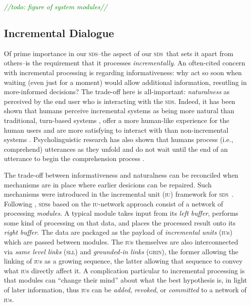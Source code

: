 \documentclass[11pt]{article}
\newcommand{\todo}[1]{\textcolor{green}{\emph{//todo: #1//}}}
\newcommand{\sds}[0]{\textsc{sds}}
\newcommand{\iu}[0]{\textsc{iu}}
\begin{document}
\todo{figure of system modules}

\subsection{Incremental Dialogue}

Of prime importance in our \sds--the aspect of our \sds\ that sets it apart from others--is the requirement that it processes \emph{incrementally}. An often-cited concern with incremental processing is regarding informativeness: why act so soon when waiting (even just for a moment) would allow additional information, resutling in more-informed decisions? The trade-off here is all-important: \emph{naturalness} as perceived by the end user who is interacting with the \sds. Indeed, it has been shown that humans perceive incremental systems as being more natural than traditional, turn-based systems \cite{Aist2006,Skantze2009,skantze2010sigdial,Asri2014}, offer a more human-like experience for the human users \cite{Edlund2008b} and are more satisfying to interact with than non-incremental systems \cite{Aistetal:incrunder-short}. Psycholinguistic research has also shown that humans process (i.e., comprehend) utterances as they unfold and do not wait until the end of an utterance to begin the comprehension process \cite{Tanenhaus1995,Spivey_2002tw}. 

The trade-off between informativeness and naturalness can be reconciled when mechanisms are in place where earlier desicions can be repaired. Such mechanisms were introduced in the incremental unit (\iu) framework for \sds\ \cite{Schlangen2009,Schlangen2011}. Following \cite{kennington-kousidis-schlangen:2014:W14-43}, \sds s based on the \iu-network approach consist of a network of processing \emph{modules}. A typical module takes input from its \emph{left buffer}, performs some kind of processing on that data, and places the processed result onto its \emph{right buffer}. The data are packaged as the payload of \emph{incremental units} (\textsc{iu}s) which are passed between modules. The \textsc{iu}s themselves are also interconnected via  \emph{same level links} (\textsc{sll}) and \emph{grounded-in links} (\textsc{grin}), the former allowing the linking of \textsc{iu}s as a growing sequence, the latter allowing that sequence to convey what \textsc{iu}s directly affect it.  A complication particular to incremental processing is that modules can ``change their mind'' about what the best hypothesis is, in light of later information, thus \textsc{iu}s can be \emph{added}, \emph{revoked}, or \emph{committed} to a network of \textsc{iu}s.
\end{document}
